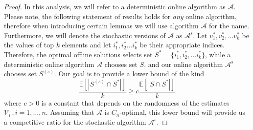 \begin{proof}
In this analysis, we will refer to a deterministic online algorithm as $\mathcal{A}$. Please note, the following statement of results holds for \textit{any} online algorithm, therefore when introducing certain lemmas we will use algorithm $\mathcal{A}$ for the name. Furthermore, we will denote the stochastic versions of $\mathcal{A}$ as $\mathcal{A}^{s}$.
Let $v_1^*, v_2^*, \dots v_k^*$ be the values of top $k$ elements and let $i_1^*, i_2^* \dots i_k^*$ be their appropriate indices. Therefore, the optimal offline solutions selects set 
$S^* = \{i_1^*, i_2^*, \dots i_k^*\}$, while a deterministic online algorithm $\mathcal{A}$ chooses set $S$, and our online algorithm $\mathcal{A}^{s}$ chooses set $S^{(s)}$. Our goal is to provide a lower bound of the kind
\begin{equation}
     \frac{\mathbb E[|S^{(s)} \cap S^*|]}{k} \geq c\frac{\mathbb E[|S \cap S^*|]}{k}
\end{equation}
where $c>0$ is a constant that depends on the randomness of the estimates $\mathcal{V}_i\,,i=1,\ldots,n.$ 
Assuming that $\mathcal{A}$ is $C_n$-optimal, this lower bound will provide us a competitive ratio for the stochastic algorithm $\mathcal{A}^{s}$.

% 



\end{proof}

